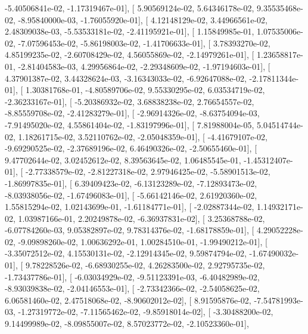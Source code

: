 \documentclass{article}
\begin{document}
         -5.40506841e-02,  -1.17319467e-01],
       [  5.90569124e-02,   5.64346178e-02,   9.35535468e-02,
         -8.95840000e-03,  -1.76055920e-01],
       [  4.12148129e-02,   3.44966561e-02,   2.48309038e-03,
         -5.53533181e-02,  -2.41195921e-01],
       [  1.15849985e-01,   1.07535006e-02,  -7.07596453e-02,
         -5.86198003e-02,  -1.41706633e-01],
       [  3.78393270e-02,   4.85199235e-02,  -2.60708429e-02,
          4.56055869e-02,  -2.14979261e-01],
       [  1.23658817e-01,  -2.81404583e-03,   4.29956864e-02,
         -2.29348609e-02,  -1.97194603e-01],
       [  4.37901387e-02,   3.44328624e-03,  -3.16343033e-02,
         -6.92647088e-02,  -2.17811344e-01],
       [  1.30381768e-01,  -4.80589706e-02,   9.55330295e-02,
          6.03534719e-02,  -2.36233167e-01],
       [ -5.20386932e-02,   3.68838238e-02,   2.76654557e-02,
         -8.85559708e-02,  -2.41283279e-01],
       [ -2.96914326e-02,  -8.63754094e-03,  -7.91495020e-02,
          4.55861404e-02,  -1.83197996e-01],
       [  7.81988004e-05,   5.04514744e-02,   1.18261715e-02,
          3.52110762e-02,  -2.05048359e-01],
       [ -4.41679107e-02,  -9.69290525e-02,  -2.37689196e-02,
          6.46490326e-02,  -2.50655460e-01],
       [  9.47702644e-02,   3.02452612e-02,   8.39563645e-02,
          1.06485545e-01,  -1.45312407e-01],
       [ -2.77338579e-02,  -2.81227318e-02,   2.97946425e-02,
         -5.58901513e-02,  -1.86997835e-01],
       [  6.39409423e-02,  -6.13123289e-02,  -7.12893473e-02,
         -8.03938056e-02,  -1.67496083e-01],
       [ -5.66142146e-02,   2.61920360e-02,   1.55815294e-02,
          1.02143699e-01,  -1.61184771e-01],
       [ -2.02887344e-02,   1.14932171e-02,   1.03987166e-01,
          2.20249878e-02,  -6.36937831e-02],
       [  3.25368788e-02,  -6.07784260e-03,   9.05382897e-02,
          9.78314376e-02,  -1.68178859e-01],
       [  4.29052228e-02,  -9.09898260e-02,   1.00636292e-01,
          1.00284510e-01,  -1.99490212e-01],
       [ -3.35072512e-02,   4.15530131e-02,  -2.12914345e-02,
          9.59874794e-02,  -1.67490032e-01],
       [  9.78228526e-02,  -6.68930255e-02,   4.26283500e-02,
          2.92795735e-02,  -1.73437786e-01],
       [ -6.03034929e-02,  -9.51123391e-03,  -6.40482989e-02,
         -8.93039838e-02,  -2.04146553e-01],
       [ -2.73342366e-02,  -2.54058625e-02,   6.06581460e-02,
          2.47518068e-02,  -8.90602012e-02],
       [  8.91595876e-02,  -7.54781993e-03,  -1.27319772e-02,
         -7.11565462e-02,  -9.85918014e-02],
       [ -3.30488200e-02,   9.14499989e-02,  -8.09855007e-02,
          8.57023772e-02,  -2.10523360e-01],
\end{document}
